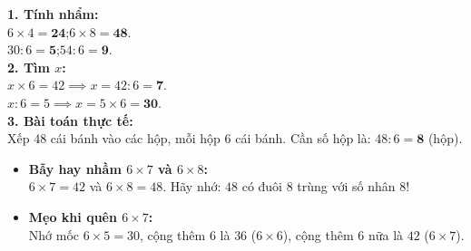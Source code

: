 \documentclass[12pt,a4paper]{article}
\begin{document}
\vspace{-2.5mm}
\noindent
\begin{minipage}[t]{0.49\textwidth}\vspace{0pt}
\begin{tcolorbox}[
  enhanced,
  colback=green!4!white,
  colframe=green!60!black,
  arc=2mm, boxrule=0.8pt,
  left=2mm, right=2mm, top=1.8mm, bottom=1.8mm,
  title={\footnotesize\bfseries\color{white}\faCheckCircle\ Ví dụ thực hành chuẩn mực}
]
{\footnotesize
\textbf{1. Tính nhẩm:}\\
$6 \times 4 = \mathbf{24}$;\quad $6 \times 8 = \mathbf{48}$.\\
$30 : 6 = \mathbf{5}$;\quad $54 : 6 = \mathbf{9}$.\\
\textbf{2. Tìm $x$:}\\
$x \times 6 = 42 \implies x = 42 : 6 = \mathbf{7}$.\\
$x : 6 = 5 \implies x = 5 \times 6 = \mathbf{30}$.\\
\textbf{3. Bài toán thực tế:}\\
Xếp $48$ cái bánh vào các hộp, mỗi hộp $6$ cái bánh. Cần số hộp là: $48 : 6 = \mathbf{8}$ (hộp).
}
\end{tcolorbox}
\end{minipage}
\hfill
\begin{minipage}[t]{0.49\textwidth}\vspace{0pt}
\begin{tcolorbox}[
  enhanced,
  colback=red!4!white,
  colframe=red!70!black,
  arc=2mm, boxrule=0.8pt,
  left=2mm, right=2mm, top=1.8mm, bottom=1.8mm,
  title={\footnotesize\bfseries\color{white}\faExclamationTriangle\ Mẹo tránh bẫy trắc nghiệm}
]
{\footnotesize
\begin{itemize}\setlength{\itemsep}{1.5pt}\setlength{\leftskip}{-2.5mm}
  \item \textbf{Bẫy hay nhầm $6 \times 7$ và $6 \times 8$:}\\
  $6 \times 7 = 42$ và $6 \times 8 = 48$. Hãy nhớ: $48$ có đuôi $8$ trùng với số nhân $8$!
  \item \textbf{Mẹo khi quên $6 \times 7$:}\\
  Nhớ mốc $6 \times 5 = 30$, cộng thêm $6$ là $36$ ($6 \times 6$), cộng thêm $6$ nữa là $42$ ($6 \times 7$).
\end{itemize}
}
\end{tcolorbox}
\end{minipage}
\end{document}
